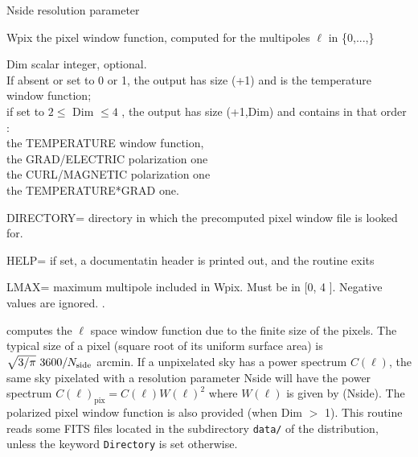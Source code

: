 \begin{qualifiers}
  \begin{qulist}{} %
    \item[Nside\mytarget{idl:healpixwindow:nside}] resolution parameter
    \item[Wpix\mytarget{idl:healpixwindow:wpix}] the pixel window function, computed for the multipoles $\ell$ in \{0,...,\}
    \item[Dim\mytarget{idl:healpixwindow:Dim}] scalar integer, optional. \\
     If absent or set to 0 or 1,
          the output has size (+1) and is the temperature
    window function;\\
     if set to $2 \le$ Dim $\le 4$ ,
          the output has size (+1,Dim)
          and contains in that order : \\
	  the TEMPERATURE window function,\\
          the GRAD/ELECTRIC polarization one\\
          the CURL/MAGNETIC polarization one\\
          the TEMPERATURE*GRAD one.
   \item[DIRECTORY=\mytarget{idl:healpixwindow:directory}] directory in which the precomputed pixel window file is looked for.\\
   \item[HELP=\mytarget{idl:healpixwindow:help}] if set, a documentatin header is printed out, 
    and the routine exits
   \item[LMAX=\mytarget{idl:healpixwindow:lmax}] maximum multipole included in Wpix. 
	Must be in [0, 4 ].
        Negative values are ignored.
	.
  \end{qulist}
\end{qualifiers}


\begin{codedescription}
{\thedocid{} computes the $\ell$ space window function due to the finite size of the
\healpix pixels. The typical size of a pixel (square root of its uniform surface
area) is $\sqrt{3/\pi}\ 3600/N_{\mathrm{side}}$ arcmin.
If a unpixelated sky has a power spectrum $C(\ell)$, the same
sky pixelated with a resolution parameter Nside 
will have the power spectrum $C(\ell)_{\mathrm{pix}} = C(\ell)
W(\ell)^2$ where $W(\ell)$ is given by \thedocid(Nside). The polarized
pixel window function is also provided (when Dim $>$ 1).
This routine reads some FITS files located in the subdirectory {\tt data/} of the
\healpix distribution, unless the keyword {\tt Directory} is set otherwise.}
\end{codedescription}



